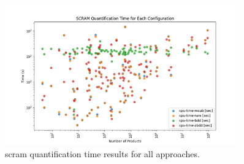 \begin{figure}[h!]
    \centering
    \includegraphics[width=0.9\textwidth]{3_identifying_gaps/benchmarking/profiling_methods/figures/scram_quant_time.png}
    \caption{scram quantification time results for all approaches.}
    \label{fig:scram_quant_time}
\end{figure}